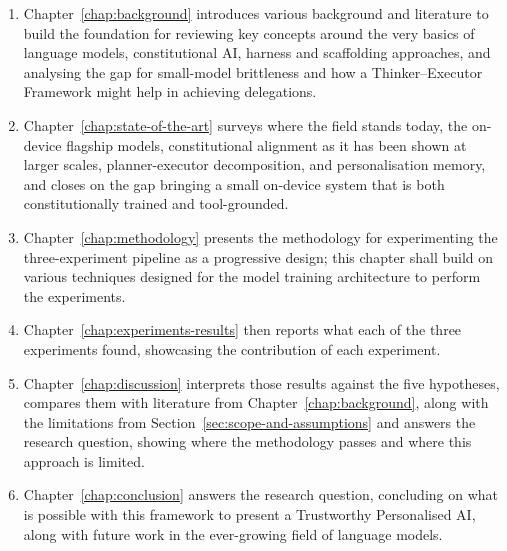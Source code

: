 \begin{enumerate}
    \item Chapter~\ref{chap:background} introduces various background and literature to build the foundation for reviewing key concepts around the very basics of language models, constitutional AI, harness and scaffolding approaches, and analysing the gap for small-model brittleness and how a Thinker--Executor Framework might help in achieving delegations.
    \item Chapter~\ref{chap:state-of-the-art} surveys where the field stands today, the on-device flagship models, constitutional alignment as it has been shown at larger scales, planner-executor decomposition, and personalisation memory, and closes on the gap bringing a small on-device system that is both constitutionally trained and tool-grounded.
    \item Chapter~\ref{chap:methodology} presents the methodology for experimenting the three-experiment pipeline as a progressive design; this chapter shall build on various techniques designed for the model training architecture to perform the experiments. 
    \item Chapter~\ref{chap:experiments-results} then reports what each of the three experiments found, showcasing the contribution of each experiment.
    \item Chapter~\ref{chap:discussion} interprets those results against the five hypotheses, compares them with literature from Chapter~\ref{chap:background}, along with the limitations from Section~\ref{sec:scope-and-assumptions} and answers the research question, showing where the methodology passes and where this approach is limited.
    \item Chapter~\ref{chap:conclusion} answers the research question, concluding on what is possible with this framework to present a Trustworthy Personalised AI, along with future work in the ever-growing field of language models.
\end{enumerate}

%
